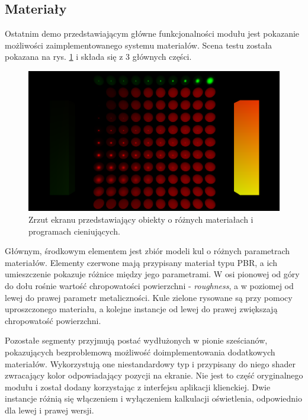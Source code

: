 \subsection{Materiały}
Ostatnim demo przedstawiającym główne funkcjonalności modułu jest pokazanie możliwości zaimplementowanego systemu materiałów. Scena testu została pokazana na rys. \ref{demo_materials} i składa się z 3 głównych części.
 
\begin{figure}[h!]
	\centering
	\includegraphics[width=\textwidth]{images/demo_materials.png}
	\caption{Zrzut ekranu przedstawiający obiekty o różnych materiałach i programach cieniujących.}
	\label{demo_materials}
\end{figure}
 
Głównym, środkowym elementem jest zbiór modeli kul o różnych parametrach materiałów. Elementy czerwone mają przypisany materiał typu PBR, a ich umieszczenie pokazuje różnice między jego parametrami. W osi pionowej od góry do dołu rośnie wartość chropowatości powierzchni - \textit{roughness}, a w poziomej od lewej do prawej parametr metaliczności. Kule zielone rysowane są przy pomocy uproszczonego materiału, a kolejne instancje od lewej do prawej zwiększają chropowatość powierzchni.

Pozostałe segmenty przyjmują postać wydłużonych w pionie sześcianów, pokazujących bezproblemową możliwość doimplementowania dodatkowych materiałów. Wykorzystują one niestandardowy typ i przypisany do niego shader zwracający kolor odpowiadający pozycji na ekranie. Nie jest to część oryginalnego modułu i został dodany korzystając z interfejsu aplikacji klienckiej. Dwie instancje różnią się włączeniem i wyłączeniem kalkulacji oświetlenia, odpowiednio dla lewej i prawej wersji. 